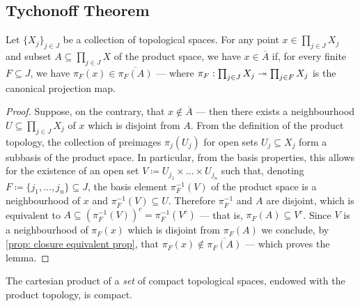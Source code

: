 \subsection{Tychonoff Theorem}

\begin{lemma}
\label{lem:tychonoff-theorem-pre-lemma}
Let \(\{X_{j}\}_{j \in J}\) be a collection of topological spaces. For any point
\(x \in \prod_{j \in J} X_j\) and subset \(A \subseteq \prod_{j \in J} X\) of
the product space, we have \(x \in \overline{A}\) if, for every finite \(F
\subseteq J\), we have \(\pi_F(x) \in \overline{\pi_F(A)}\) --- where \(\pi_F:
\prod_{j \in J} X_j \twoheadrightarrow \prod_{j \in F} X_j\) is the canonical projection map.
\end{lemma}

\begin{proof}
Suppose, on the contrary, that \(x \notin \overline{A}\) --- then there exists a
neighbourhood \(U \subseteq \prod_{j \in J} X_j\) of \(x\) which is disjoint
from \(A\). From the definition of the product topology, the collection of
preimages \(\pi_j(U_j)\) for open sets \(U_j \subseteq X_j\) form a subbasis of
the product space. In particular, from the basis properties, this allows for the
existence of an open set \(V \coloneq U_{j_1} \times \dots \times U_{j_n}\) such
that, denoting \(F \coloneq \{j_1, \dots, j_n\} \subseteq J\), the basis element
\(\pi^{-1}_F(V)\) of the product space is a neighbourhood of \(x\) and
\(\pi_F^{-1}(V) \subseteq U\). Therefore \(\pi_F^{-1}\) and \(A\) are disjoint,
which is equivalent to \(A \subseteq (\pi_F^{-1}(V))^c = \pi_F^{-1}(V^c)\) ---
that is, \(\pi_F(A) \subseteq V^c\). Since \(V\) is a neighbourhood of
\(\pi_F(x)\) which is disjoint from \(\pi_F(A)\) we conclude, by \cref{prop:
  closure equivalent prop}, that \(\pi_F(x) \notin \overline{\pi_F(A)}\) ---
which proves the lemma.
\end{proof}

\begin{theorem}[Tychonoff]
\label{thm:tychonoff-theorem}
The cartesian product of a \emph{set} of compact topological spaces, endowed
with the product topology, is compact.
\end{theorem}

